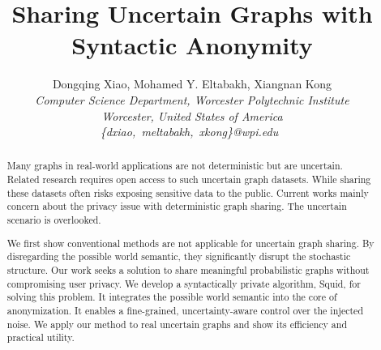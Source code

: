 \documentclass[10pt,conference,letterpaper]{IEEEtran}
\title{Sharing Uncertain Graphs with Syntactic Anonymity}
\author{%
{Dongqing Xiao, Mohamed Y. Eltabakh, Xiangnan Kong}%
\vspace{1.4mm}\\
\fontsize{10}{10}\selectfont\itshape
Computer Science Department, Worcester Polytechnic Institute \\
Worcester, United States of America\\
\fontsize{9}{9}\selectfont\ttfamily\upshape
\{dxiao,~meltabakh,~xkong\}@wpi.edu\
}
\theoremstyle{plain}
\begin{document}
\maketitle


%

\begin{abstract}  
Many graphs in real-world applications are not deterministic but are uncertain. Related research requires open access to such uncertain graph datasets. While sharing these datasets often risks exposing sensitive data to the public. Current works mainly concern about the privacy issue with deterministic graph sharing.  The uncertain scenario is overlooked. 

We first show conventional methods are not applicable for uncertain graph sharing. By disregarding the possible world semantic, they significantly disrupt the stochastic structure. Our work seeks a solution to share meaningful probabilistic graphs without compromising user privacy. We develop a syntactically private algorithm, Squid, for solving this problem. It integrates the possible world semantic into the core of anonymization. It enables a fine-grained, uncertainty-aware control over the injected noise. We apply our method to real uncertain graphs and show its efficiency and practical utility. 
\end{abstract}









% 

\end{document}

